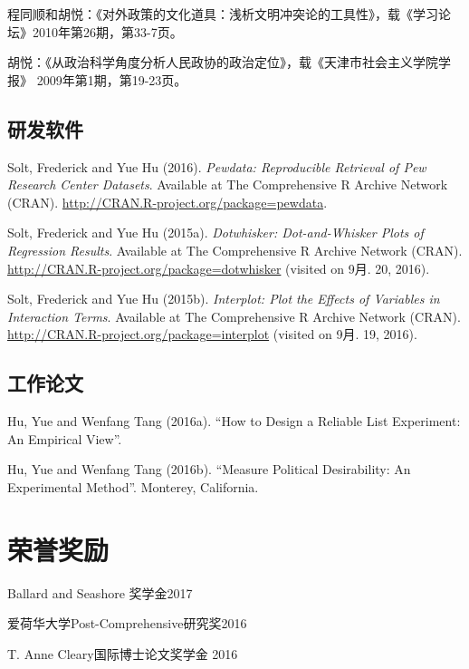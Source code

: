\documentclass[10.5pt,]{article}
\providecommand{\tightlist}{%
	\setlength{\itemsep}{0pt}\setlength{\parskip}{0pt}}
\renewenvironment{itemize}{
	\begin{list}{}{
			\setlength{\leftmargin}{1.5em}
		}
	}{
	\end{list}
}
\begin{document}
程同顺和胡悦：《对外政策的文化道具：浅析文明冲突论的工具性》，载《学习论坛》2010年第26期，第33-7页。

胡悦：《从政治科学角度分析人民政协的政治定位》，载《天津市社会主义学院学报》
2009年第1期，第19-23页。

\hypertarget{ux7814ux53d1ux8f6fux4ef6}{%
\subsection{研发软件}\label{ux7814ux53d1ux8f6fux4ef6}}

Solt, Frederick and Yue Hu (2016).
\emph{Pewdata: Reproducible Retrieval of Pew Research Center Datasets}.
Available at The Comprehensive R Archive Network (CRAN).
\url{http://CRAN.R-project.org/package=pewdata}.

Solt, Frederick and Yue Hu (2015a).
\emph{Dotwhisker: Dot-and-Whisker Plots of Regression Results}.
Available at The Comprehensive R Archive Network (CRAN).
\url{http://CRAN.R-project.org/package=dotwhisker} (visited on 9月. 20,
2016).

Solt, Frederick and Yue Hu (2015b).
\emph{Interplot: Plot the Effects of Variables in Interaction Terms}.
Available at The Comprehensive R Archive Network (CRAN).
\url{http://CRAN.R-project.org/package=interplot} (visited on 9月. 19,
2016).

\hypertarget{ux5de5ux4f5cux8bbaux6587}{%
\subsection{工作论文}\label{ux5de5ux4f5cux8bbaux6587}}

Hu, Yue and Wenfang Tang (2016a). ``How to Design a Reliable List
Experiment: An Empirical View''.

Hu, Yue and Wenfang Tang (2016b). ``Measure Political Desirability: An
Experimental Method''. Monterey, California.

\hypertarget{ux8363ux8a89ux5956ux52b1}{%
\section{荣誉奖励}\label{ux8363ux8a89ux5956ux52b1}}

\begin{itemize}
\tightlist
\item
  Ballard and Seashore 奖学金\hfill 2017
\item
  爱荷华大学Post-Comprehensive研究奖\hfill 2016
\item
  T. Anne Cleary国际博士论文奖学金 \hfill 2016
\end{itemize}
\end{document}
